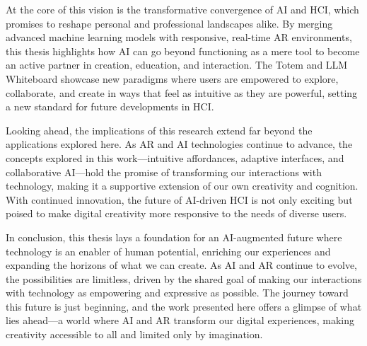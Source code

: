 At the core of this vision is the transformative convergence of AI and HCI, which promises to reshape personal and professional landscapes alike.
By merging advanced machine learning models with responsive, real-time AR environments, this thesis highlights how AI can go beyond functioning as a mere tool to become an active partner in creation, education, and interaction.
The Totem and LLM Whiteboard showcase new paradigms where users are empowered to explore, collaborate, and create in ways that feel as intuitive as they are powerful, setting a new standard for future developments in HCI.

Looking ahead, the implications of this research extend far beyond the applications explored here.
As AR and AI technologies continue to advance, the concepts explored in this work—intuitive affordances, adaptive interfaces, and collaborative AI—hold the promise of transforming our interactions with technology, making it a supportive extension of our own creativity and cognition.
With continued innovation, the future of AI-driven HCI is not only exciting but poised to make digital creativity more responsive to the needs of diverse users.

In conclusion, this thesis lays a foundation for an AI-augmented future where technology is an enabler of human potential, enriching our experiences and expanding the horizons of what we can create.
As AI and AR continue to evolve, the possibilities are limitless, driven by the shared goal of making our interactions with technology as empowering and expressive as possible.
The journey toward this future is just beginning, and the work presented here offers a glimpse of what lies ahead—a world where AI and AR transform our digital experiences, making creativity accessible to all and limited only by imagination.